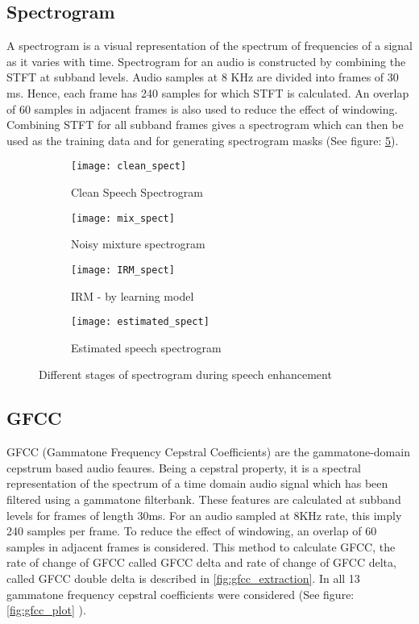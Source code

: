 \subsection{\textbf{Spectrogram}}
A spectrogram is a visual representation of the spectrum of frequencies of a signal as it varies with time. Spectrogram for an audio is constructed by combining the STFT at subband levels. Audio samples at 8 K\si{\hertz} are divided into frames of 30 m\si{\second}. Hence, each frame has 240 samples for which STFT is calculated. An overlap of 60 samples in adjacent frames is also used to reduce the effect of windowing. Combining STFT for all subband frames gives a spectrogram which can then be used as the training data and for generating spectrogram masks (See figure: \ref{fig:spect}).
\begin{figure}
\centering
\begin{subfigure}{.4\textwidth}
  \centering
  \texttt{[image: clean\_spect]}
  \caption{Clean Speech Spectrogram}
  \label{fig:clean_spect}
\end{subfigure}%
\begin{subfigure}{.4\textwidth}
  \centering
  \texttt{[image: mix\_spect]}
  \caption{Noisy mixture spectrogram}
  \label{fig:mix_spect}
\end{subfigure}
\begin{subfigure}{.4\textwidth}
  \centering
  \texttt{[image: IRM\_spect]}
  \caption{IRM - by learning model}
  \label{fig:irm_spect}
\end{subfigure}
\begin{subfigure}{.4\textwidth}
  \centering
  \texttt{[image: estimated\_spect]}
  \caption{Estimated speech spectrogram}
  \label{fig:est_spect}
\end{subfigure}
\caption{Different stages of spectrogram during speech enhancement}
\label{fig:spect}
\end{figure}

\subsection{\textbf{GFCC}}
GFCC (Gammatone Frequency Cepstral Coefficients) are the gammatone-domain cepstrum based audio feaures. Being a cepstral property, it is a spectral representation of the spectrum of a time domain audio signal which has been filtered using a gammatone filterbank. These features are calculated at subband levels for frames of length 30ms. For an audio sampled at 8K\si{\hertz} rate, this imply 240 samples per frame. To reduce the effect of windowing, an overlap of 60 samples in adjacent frames is considered. This method to calculate GFCC, the rate of change of GFCC called GFCC delta and rate of change of GFCC delta, called GFCC double delta is described in \ref{fig:gfcc_extraction}. In all 13 gammatone frequency cepstral coefficients were considered (See figure: \ref{fig:gfcc_plot} \cite{mathworks:gtcc}).  

